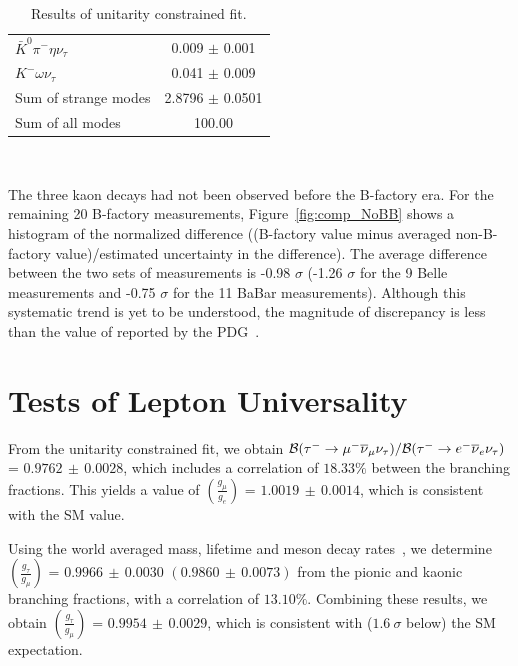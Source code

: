 \documentclass[fleqn,twoside]{article}
\begin{document}
\begin{table}[!hbtp]
\begin{tabular}{l| c}
$\bar{K}^0 \pi^- \eta \nu_\tau$                                     & 0.009 $\pm$ 0.001 \\ 
$K^- \omega \nu_\tau$                                              & 0.041 $\pm$ 0.009 \\ 
\hline
Sum of strange modes                                              & 2.8796 $\pm$ 0.0501 \\ \hline
Sum of all modes                                                  & 100.00              \\ \hline
\end{tabular}\\[2pt]
\caption{Results of unitarity constrained fit.}
\label{tab:TauGlobalFit}
\end{table}

The three kaon decays had not been observed before the B-factory era.
For the remaining 20 B-factory measurements, 
Figure~\ref{fig:comp_NoBB} shows a histogram of the normalized difference 
((B-factory value minus averaged non-B-factory value)/estimated uncertainty in the difference).
The average difference between the two sets of measurements is -0.98 $\sigma$ 
(-1.26 $\sigma$ for the 9 Belle measurements and -0.75 $\sigma$ for the 11 BaBar measurements).
Although this systematic trend is yet to be understood,
the magnitude of discrepancy is less than the value of reported by the PDG~\cite{PDG_2010}.



\section{Tests of Lepton Universality}
\label{sec:Tau_LU}

From the unitarity constrained fit, we obtain
$
{{\cal{B}}({\tau^- \to \mu^- \overline{\nu}_\mu \nu_\tau})}/
{{\cal{B}}({\tau^- \to e^- \overline{\nu}_e  \nu_\tau})}$
= 
$0.9762\, \pm\,   0.0028$,
which includes a correlation of $18.33\%$
between the branching fractions.
This yields a value of $\left( \frac{g_\mu}{g_e} \right)$ = 
$1.0019\, \pm\, 0.0014$,
which is consistent with the SM value.

Using the world averaged mass, lifetime and meson decay rates~\cite{PDG_2010}, we determine 
$\left( \frac{g_{\tau}}{g_{\mu}} \right)$ =
$0.9966\, \pm\, 0.0030$ $(0.9860\, \pm\, 0.0073)$
from the pionic and kaonic branching fractions,
with a correlation of $13.10\%$.
Combining these results, we obtain 
$\left( \frac{g_{\tau}}{g_{\mu}} \right)$ = $0.9954\, \pm\, 0.0029$,
which is consistent with ($1.6~\sigma$ below) the SM expectation.
\end{document}
